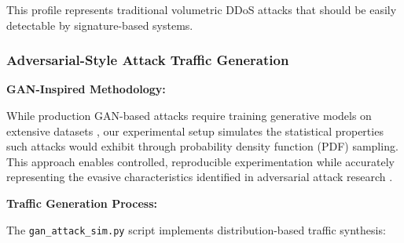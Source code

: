 This profile represents traditional volumetric DDoS attacks that should be easily detectable by signature-based systems.

\subsubsection{Adversarial-Style Attack Traffic Generation}

\textbf{GAN-Inspired Methodology:}

While production GAN-based attacks require training generative models on extensive datasets \cite{akana2023}, our experimental setup simulates the statistical properties such attacks would exhibit through probability density function (PDF) sampling. This approach enables controlled, reproducible experimentation while accurately representing the evasive characteristics identified in adversarial attack research \cite{chauhan2020, shieh2022dual, shieh2021synthesis}.

\textbf{Traffic Generation Process:}

The \texttt{gan\_attack\_sim.py} script implements distribution-based traffic synthesis:

